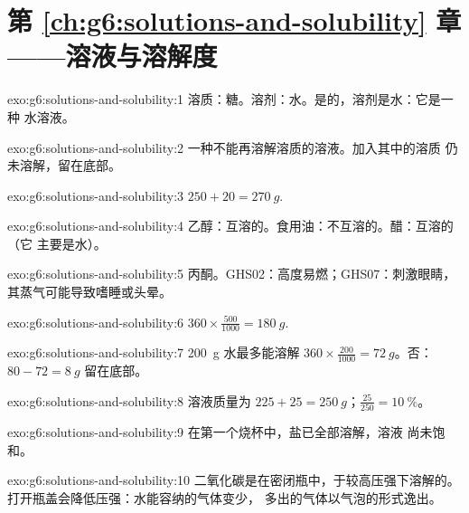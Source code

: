 \section*{第 \ref{ch:g6:solutions-and-solubility} 章——溶液与溶解度}

\begin{solution}{exo:g6:solutions-and-solubility:1}
溶质：糖。溶剂：水。是的，溶剂是水：它是一种
水溶液。
\end{solution}

\begin{solution}{exo:g6:solutions-and-solubility:2}
一种不能再溶解溶质的溶液。加入其中的溶质
仍未溶解，留在底部。
\end{solution}

\begin{solution}{exo:g6:solutions-and-solubility:3}
$250 + 20 = \qty{270}{g}$.
\end{solution}

\begin{solution}{exo:g6:solutions-and-solubility:4}
乙醇：互溶的。食用油：不互溶的。醋：互溶的（它
主要是水）。
\end{solution}

\begin{solution}{exo:g6:solutions-and-solubility:5}
丙酮。GHS02：高度易燃；GHS07：刺激眼睛，
其蒸气可能导致嗜睡或头晕。
\end{solution}

\begin{solution}{exo:g6:solutions-and-solubility:6}
$360 \times \frac{500}{1000} = \qty{180}{g}$.
\end{solution}

\begin{solution}{exo:g6:solutions-and-solubility:7}
\qty{200}{g} 水最多能溶解 $360 \times \frac{200}{1000} =
\qty{72}{g}$。否：$80 - 72 = \qty{8}{g}$ 留在底部。
\end{solution}

\begin{solution}{exo:g6:solutions-and-solubility:8}
溶液质量为 $225 + 25 = \qty{250}{g}$；$\frac{25}{250} =
\qty{10}{\percent}$。
\end{solution}

\begin{solution}{exo:g6:solutions-and-solubility:9}
在第一个烧杯中，盐已全部溶解，溶液
尚未饱和。
\end{solution}

\begin{solution}{exo:g6:solutions-and-solubility:10}
二氧化碳是在密闭瓶中，于较高压强下溶解的。
打开瓶盖会降低压强：水能容纳的气体变少，
多出的气体以气泡的形式逸出。
\end{solution}

